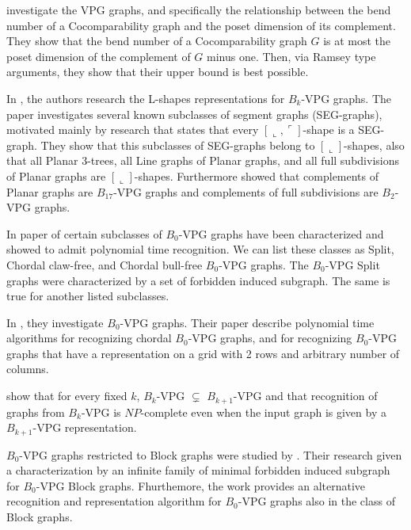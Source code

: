 \citet{cohen2016posets} investigate the VPG graphs, and specifically the relationship between the bend number of a Cocomparability graph and the poset dimension of its complement. They show that the bend number of a Cocomparability graph $G$ is at most the poset dimension of the complement of $G$ minus one. Then, via Ramsey type arguments, they show that their upper bound is best  possible.


In \citet{felsner2016intersection}, the authors research the L-shapes representations for $B_k$-VPG graphs. The paper investigates several known subclasses of segment graphs (SEG-graphs), motivated mainly by research \cite{middendorf1992max} that states that every $[\llcorner, \ulcorner]$-shape is a SEG-graph.
They show that this subclasses of SEG-graphs belong to $[\llcorner]$-shapes, also that all Planar 3-trees, all Line graphs of Planar graphs, and all full subdivisions of Planar graphs are $[\llcorner]$-shapes. Furthermore \cite{felsner2016intersection} showed that complements of Planar graphs are $B_{17}$-VPG graphs and complements of full subdivisions are $B_2$-VPG graphs. 

In paper of \citet{golumbic2013intersection} certain subclasses of $B_0$-VPG graphs have been characterized and showed to admit polynomial time recognition. We can list these classes as Split, Chordal claw-free, and Chordal bull-free $B_0$-VPG graphs.
The $B_0$-VPG Split graphs were characterized by  a set of forbidden induced subgraph. The same is true for another listed subclasses.


In \citet{chaplick2011recognizing}, they investigate  $B_0$-VPG graphs. Their paper describe polynomial time
algorithms for recognizing chordal $B_0$-VPG graphs, and for recognizing $B_0$-VPG graphs that have a representation on a grid with 2 rows and arbitrary number of columns.

\citet{chaplick2012bend} show  that for every fixed $k$, $B_k$-VPG $\subsetneq$ $B_{k+1}$-VPG and that recognition of graphs from $B_k$-VPG is $NP$-complete even when the input graph is given by a $B_{k+1}$-VPG representation. 


$B_0$-VPG graphs restricted to Block graphs were studied by \citet{Alcn2017VertexIG}. Their research given a characterization by an infinite family of minimal forbidden induced subgraph  for $B_0$-VPG Block graphs. Fhurthemore, the work provides an alternative recognition and representation algorithm for $B_0$-VPG graphs also in the class of Block graphs.





